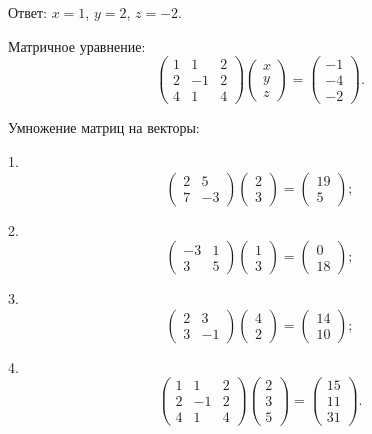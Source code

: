 \documentclass[14pt,a4paper]{extarticle}
\begin{document}
Ответ: \( x = 1 \), \( y = 2 \), \( z = -2 \).

Матричное уравнение:
\[\begin{pmatrix}1 & 1 & 2 \\2 & -1 & 2 \\4 & 1 & 4\end{pmatrix}\begin{pmatrix}x \\y \\z\end{pmatrix}=\begin{pmatrix}-1 \\-4 \\-2\end{pmatrix}.\]

Умножение матриц на векторы:

1.
\[
\begin{pmatrix} 2 & 5 \\ 7 & -3\end{pmatrix}
\begin{pmatrix} 2 \\ 3\end{pmatrix} = \begin{pmatrix} 19 \\ 5\end{pmatrix}
;\]

2.
\[
\begin{pmatrix} -3 & 1 \\ 3 & 5\end{pmatrix}
\begin{pmatrix} 1 \\ 3\end{pmatrix} = \begin{pmatrix} 0 \\ 18 \end{pmatrix}
;\]

3.
\[
\begin{pmatrix} 2 & 3 \\ 3 & -1\end{pmatrix}
\begin{pmatrix} 4 \\ 2\end{pmatrix} = \begin{pmatrix} 14 \\ 10 \end{pmatrix}
;\]

4.
\[
\begin{pmatrix} 1 & 1 & 2 \\ 2 & -1 & 2 \\4 & 1 & 4\end{pmatrix}
\begin{pmatrix} 2 \\ 3 \\ 5\end{pmatrix} = \begin{pmatrix} 15 \\ 11 \\ 31 \end{pmatrix}
.\]
\end{document}
